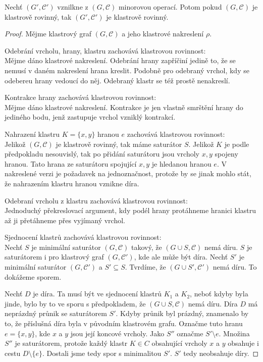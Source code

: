 \begin{tvr} Nechť $(G', \mathcal C')$ vznilkne z $(G, \mathcal C)$ minorovou operací. Potom pokud $(G, \mathcal C)$ je klastrově rovinný, tak $(G', \mathcal C')$ je klastrově rovinný.
\label{min_op_zach_kl_rov}
\end{tvr}
\begin{proof}

Mějme klastrový graf $(G, \mathcal C)$ a jeho klastrové nakreslení $\rho$.

Odebrání vrcholu, hrany, klastru zachovává klastrovou rovinnost:\\
Mějme dáno klastrové nakreslení. Odebrání hrany zapříčiní jedině to, že se nemusí v daném nakreslení hrana kreslit. Podobně pro odebraný vrchol, kdy se odebereu hrany vedoucí do něj. Odebraný klastr se též prostě nenakreslí.

Kontrakce hrany zachovává klastrovou rovinnost:\\
Mějme dáno klastrové nakreslení. Kontrakce je jen vlastně smrštění hrany do jediného bodu, jenž zastupuje vrchol vzniklý kontrakcí.

Nahrazení klastru $K=\{x,y\}$ hranou $e$ zachovává klastrovou rovinnost:\\
Jelikož $(G, \mathcal C)$ je klastrově rovinný, tak máme saturátor $S$. Jelikož $K$ je podle předpokladu nesouvislý, tak po přidání saturátoru jsou vrcholy $x, y$ spojeny hranou. Tato hrana ze saturátoru spojující $x,y$ je hledanou hranou $e$. V nakreslené verzi je požadavek na jednoznačnost, protože by se jinak mohlo stát, že nahrazením klastru hranou vznikne díra.  

Odebraní vrcholu z klastru zachovává klastrovou rovinnost:\\
Jednoduchý překreslovací argument, kdy podél hrany protáhneme hranici klastru až ji přetáhneme přes vyjímaný vrchol.

Sjednocení klastrů zachovává klastrovou rovinnost:\\
Nechť $S$ je minimální saturátor $(G,\mathcal C)$ takový, že $(G \cup S,\mathcal C)$ nemá díru. $S$ je saturátorem i pro klastrový graf $(G, \mathcal C')$, kde ale může být díra.
Nechť $S'$ je  minimální saturátor $(G, \mathcal C')$ a $S' \subseteq S$. Tvrdíme, že $(G \cup S',\mathcal C')$ nemá díru. To dokážeme sporem.

Nechť $D$ je díra. Ta musí být ve sjednocení klastrů $K_1$ a $K_2$, neboť kdyby byla jinde, bylo by to ve sporu s předpokladem, že $(G \cup S, \mathcal C)$ nemá díru.
Díra $D$ má neprázdný průnik se saturátorem $S'$. Kdyby průnik byl prázdný, znamenalo by to, že příslušná díra byla v původním klastrovém grafu. Označme tuto hranu $e = \{x,y\}$, kde $x$ a $y$ jsou její koncové vrcholy.
Jako $S''$ označme $S' \setminus e$. Množina $S''$ je saturátorem, protože každý klastr $K \in C$ obsahující vrcholy  $x$ a $y$ obsahuje i cestu $D \setminus \{e\}$. Dostali jsme tedy spor s minimalitou $S'$. $S'$ tedy neobsahuje díry.
\end{proof}


